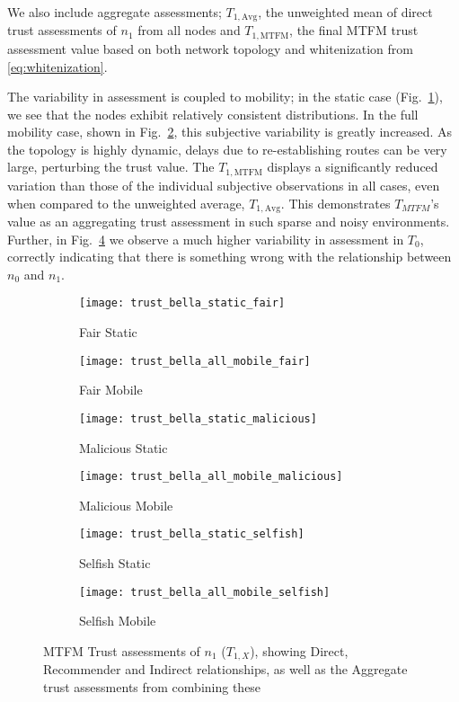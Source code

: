 We also include aggregate assessments; $T_{1,\text{Avg}}$, the unweighted mean of direct trust assessments of $n_1$ from all nodes and $T_{1,\text{MTFM}}$, the final MTFM trust assessment value based on both network topology and whitenization from \eqref{eq:whitenization}.

The variability in assessment is coupled to mobility; in the static case (Fig.~\ref{fig:trust_static}), we see that the nodes exhibit relatively consistent distributions.
In the full mobility case, shown in Fig.~\ref{fig:trust_all_mobile}, this subjective variability is greatly increased. 
As the topology is highly dynamic, delays due to re-establishing routes can be very large, perturbing the trust value.
The $T_{1,\text{MTFM}}$ displays a significantly reduced variation than those of the individual subjective observations in all cases, even when compared to the unweighted average, $T_{1,\text{Avg}}$.
This demonstrates $T_{MTFM}$'s value as an aggregating trust assessment in such sparse and noisy environments.
Further, in Fig.~\ref{fig:trust_all_mobile_mal} we observe a much higher variability in assessment in $T_0$, correctly indicating that there is something wrong with the relationship between $n_0$ and $n_1$.

\begin{figure}[h]
	\centering
	\begin{subfigure}{0.5\textwidth}
	\caption{Fair Static}
	\texttt{[image: trust\_bella\_static\_fair]} 
	\label{fig:trust_static}
	\end{subfigure}%
	\begin{subfigure}{0.5\textwidth}
	\caption{Fair Mobile}
	\texttt{[image: trust\_bella\_all\_mobile\_fair]}  
	\label{fig:trust_all_mobile}
	\end{subfigure}%
	
	\begin{subfigure}{0.5\textwidth}
	\caption{Malicious Static}
	\texttt{[image: trust\_bella\_static\_malicious]} 
	\label{fig:trust_static_mal}
	\end{subfigure}%
	\begin{subfigure}{0.5\textwidth}
	\caption{Malicious Mobile}
	\texttt{[image: trust\_bella\_all\_mobile\_malicious]}  
	\label{fig:trust_all_mobile_mal}
	\end{subfigure}%
	
	\begin{subfigure}{0.5\textwidth}
	\caption{Selfish Static}
	\texttt{[image: trust\_bella\_static\_selfish]}
	\label{fig:trust_static_sel}
	\end{subfigure}%
	\begin{subfigure}{0.5\textwidth}
	\caption{Selfish Mobile}
	\texttt{[image: trust\_bella\_all\_mobile\_selfish]}  \label{fig:trust_all_mobile_sel}
	\end{subfigure}%

	\caption{MTFM Trust assessments of $n_1$ ($T_{1,X}$), showing Direct, Recommender and Indirect relationships, as well as the Aggregate trust assessments from combining these} 
	\label{fig:trust_mobility}
\end{figure}
%

